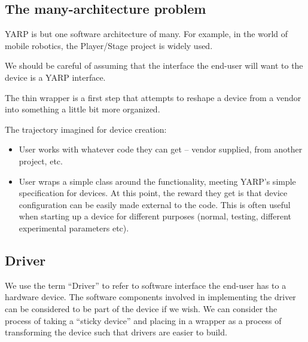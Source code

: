 \subsection{The many-architecture problem}

YARP is but one software architecture of many.  For example, in the
world of mobile robotics, the Player/Stage project is widely used.

We should be careful of assuming that the interface the end-user will
want to the device is a YARP interface.

The thin wrapper is a first step that attempts to reshape a
device from a vendor into something a little bit more organized.

The trajectory imagined for device creation:

\begin{itemize}

\item User works with whatever code they can get -- vendor
supplied, from another project, etc.

\item User wraps a simple class around the functionality,
meeting YARP's simple specification for devices.  At this
point, the reward they get is that device configuration
can be easily made external to the code.  This is often
useful when starting up a device for different purposes
(normal, testing, different experimental parameters etc).

\end{itemize}


\subsection{Driver}

We use the term ``Driver'' to refer to software interface the end-user
has to a hardware device.  The software components involved in
implementing the driver can be considered to be part of the device if
we wish.  We can consider the process of taking a ``sticky device''
and placing in a wrapper as a process of transforming the device such
that drivers are easier to build.


